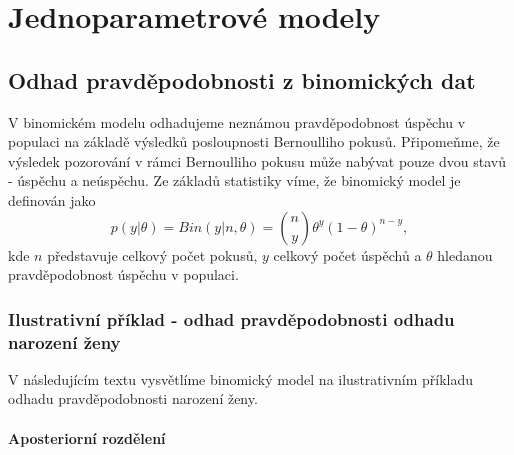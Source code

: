 \chapter{Jednoparametrové modely}

\section{Odhad pravděpodobnosti z binomických dat}

V binomickém modelu odhadujeme neznámou pravděpodobnost úspěchu v populaci na základě výsledků posloupnosti Bernoulliho pokusů. Připomeňme, že výsledek pozorování v rámci Bernoulliho pokusu může nabývat pouze dvou stavů - úspěchu a neúspěchu. Ze základů statistiky víme, že binomický model je definován jako
\begin{equation}
p(y|\theta) = \textit{Bin}(y|n, \theta) = {n \choose y} \theta^y (1 - \theta)^{n - y},
\end{equation}
kde $n$ představuje celkový počet pokusů, $y$ celkový počet úspěchů a $\theta$ hledanou pravděpodobnost úspěchu v populaci. 

\subsection{Ilustrativní příklad - odhad pravděpodobnosti odhadu narození ženy}

V následujícím textu vysvětlíme binomický model na ilustrativním příkladu odhadu pravděpodobnosti narození ženy.

\subsubsection{Aposteriorní rozdělení}


